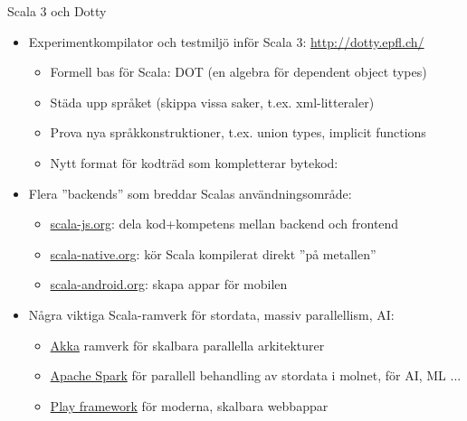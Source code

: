 \begin{Slide}{Scala 3 och Dotty}\SlideFontSmall
\begin{itemize}
\item Experimentkompilator och testmiljö inför Scala 3:  \url{http://dotty.epfl.ch/}
\begin{itemize}\SlideFontTiny
  \item Formell bas för Scala: DOT (en algebra för dependent object types)
  \item Städa upp språket (skippa vissa saker, t.ex. xml-litteraler)
  \item Prova nya språkkonstruktioner, t.ex. union types, implicit functions
  \item Nytt format för kodträd som kompletterar bytekod: \\
\end{itemize}
\item Flera ''backends'' som breddar Scalas användningsområde:
\begin{itemize}\SlideFontTiny
  \item \href{http://www.scala-js.org/}{scala-js.org}: dela kod+kompetens mellan backend och frontend
  \item \href{http://scala-native.org}{scala-native.org}: kör Scala kompilerat direkt ''på metallen''
  \item \href{http://scala-android.org}{scala-android.org}: skapa appar för mobilen
\end{itemize}
\item Några viktiga Scala-ramverk för stordata, massiv parallellism, AI:
\begin{itemize}\SlideFontTiny
  \item \href{https://akka.io/}{Akka} ramverk för skalbara parallella arkitekturer
  \item \href{https://spark.apache.org/}{Apache Spark} för parallell behandling av stordata i molnet, för AI, ML ...
  \item \href{https://www.playframework.com/}{Play framework} för moderna, skalbara webbappar
\end{itemize}
\end{itemize}
\end{Slide}






